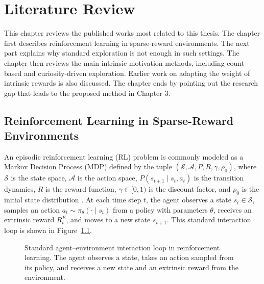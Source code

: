 \chapter{Literature Review}
\label{ch:literature}

This chapter reviews the published works most related to this thesis. The chapter first describes reinforcement learning in sparse-reward environments. The next part explains why standard exploration is not enough in such settings. The chapter then reviews the main intrinsic motivation methods, including count-based and curiosity-driven exploration. Earlier work on adapting the weight of intrinsic rewards is also discussed. The chapter ends by pointing out the research gap that leads to the proposed method in Chapter 3.

\section{Reinforcement Learning in Sparse-Reward Environments}
An episodic reinforcement learning (RL) problem is commonly modeled as a Markov Decision Process (MDP) defined by the tuple $(\mathcal{S}, \mathcal{A}, P, R, \gamma, \rho_0)$, where $\mathcal{S}$ is the state space, $\mathcal{A}$ is the action space, $P(s_{t+1} \mid s_t, a_t)$ is the transition dynamics, $R$ is the reward function, $\gamma \in [0, 1)$ is the discount factor, and $\rho_0$ is the initial state distribution \cite{sutton2018rl}. At each time step $t$, the agent observes a state $s_t \in \mathcal{S}$, samples an action $a_t \sim \pi_\theta(\cdot \mid s_t)$ from a policy with parameters $\theta$, receives an extrinsic reward $R_t^E$, and moves to a new state $s_{t+1}$. This standard interaction loop is shown in Figure~\ref{fig:rl_loop}.

\begin{figure}[H]
\centering
{}
\caption[Agent--environment interaction loop.]{Standard agent--environment interaction loop in reinforcement learning. The agent observes a state, takes an action sampled from its policy, and receives a new state and an extrinsic reward from the environment.}
\label{fig:rl_loop}
\end{figure}

